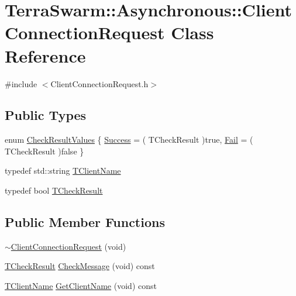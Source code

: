 \hypertarget{class_terra_swarm_1_1_asynchronous_1_1_client_connection_request}{\section{Terra\-Swarm\-:\-:Asynchronous\-:\-:Client\-Connection\-Request Class Reference}
\label{class_terra_swarm_1_1_asynchronous_1_1_client_connection_request}
}


{\ttfamily \#include $<$Client\-Connection\-Request.\-h$>$}

\subsection*{Public Types}
\begin{DoxyCompactItemize}
\item 
enum \hyperlink{class_terra_swarm_1_1_asynchronous_1_1_client_connection_request_a4bf8bd6c59ce06a2866216fa2d475486}{Check\-Result\-Values} \{ \hyperlink{class_terra_swarm_1_1_asynchronous_1_1_client_connection_request_a4bf8bd6c59ce06a2866216fa2d475486a2bc78a5f6820084d63ec2155279020f5}{Success} = ( T\-Check\-Result )true, 
\hyperlink{class_terra_swarm_1_1_asynchronous_1_1_client_connection_request_a4bf8bd6c59ce06a2866216fa2d475486a7fc097e234db70697be97d0975d6a1d6}{Fail} = ( T\-Check\-Result )false
 \}
\item 
typedef std\-::string \hyperlink{class_terra_swarm_1_1_asynchronous_1_1_client_connection_request_a50a16fcfef8eb10d5191b6eaf0723a92}{T\-Client\-Name}
\item 
typedef bool \hyperlink{class_terra_swarm_1_1_asynchronous_1_1_client_connection_request_a5c46a6a486f1f74b413e11b919b44d4f}{T\-Check\-Result}
\end{DoxyCompactItemize}
\subsection*{Public Member Functions}
\begin{DoxyCompactItemize}
\item 
\hyperlink{class_terra_swarm_1_1_asynchronous_1_1_client_connection_request_a610c90a4ff7b849f86c2ddc962ba1c85}{$\sim$\-Client\-Connection\-Request} (void)
\item 
\hyperlink{class_terra_swarm_1_1_asynchronous_1_1_client_connection_request_a5c46a6a486f1f74b413e11b919b44d4f}{T\-Check\-Result} \hyperlink{class_terra_swarm_1_1_asynchronous_1_1_client_connection_request_a4454fa8df10870c78049ffb0e8c594f6}{Check\-Message} (void) const 
\item 
\hyperlink{class_terra_swarm_1_1_asynchronous_1_1_client_connection_request_a50a16fcfef8eb10d5191b6eaf0723a92}{T\-Client\-Name} \hyperlink{class_terra_swarm_1_1_asynchronous_1_1_client_connection_request_a06ce45d6a43bc6e92437a8f6deb5c09a}{Get\-Client\-Name} (void) const 
\end{DoxyCompactItemize}
